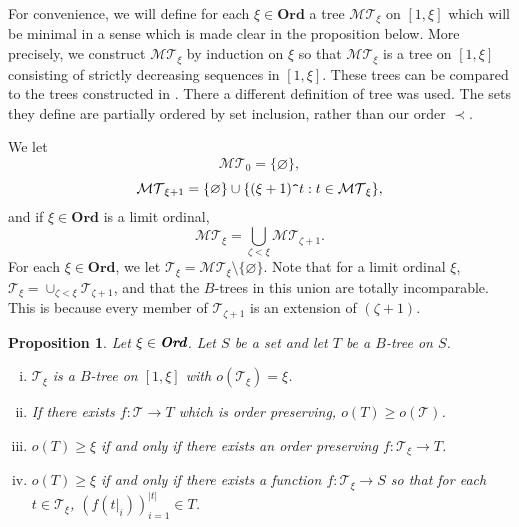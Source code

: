 \documentclass[12pt]{amsart}
\newtheorem{proposition}[theorem]{Proposition}
\theoremstyle{definition}
\newcommand{\ord}{\textbf{Ord}}
\newcommand{\mt}{\mathcal{MT}}
\newcommand{\ttt}{\mathcal{T}}
\begin{document}
For convenience, we will define for each $\xi\in \ord$ a tree $\mt_\xi$ on $[1, \xi]$ which will be minimal in a sense which is made clear in the proposition below.  More precisely, we construct $\mt_\xi$ by induction on $\xi$ so that $\mt_\xi$ is a tree on $[1, \xi]$ consisting of strictly decreasing sequences in $[1, \xi]$.  These trees can be compared to the trees constructed in \cite{JO}.  There a different definition of tree was used.  The sets they define are partially ordered by set inclusion, rather than our order $\prec$.  

We let $$\mt_0=\{\varnothing\},$$ $$\mt_{\xi+1}=\{\varnothing\}\cup \{(\xi+1)\verb!^!t: t\in \mt_\xi\},$$ and if $\xi\in \ord$ is a limit ordinal, $$\mt_\xi=\bigcup_{\zeta<\xi}\mt_{\zeta+1}.$$  For each $\xi\in \ord$, we let $\ttt_\xi=\mt_\xi\setminus \{\varnothing\}$.  Note that for a limit ordinal $\xi$, $\ttt_\xi=\cup_{\zeta<\xi}\ttt_{\zeta+1}$, and that the $B$-trees in this union are totally incomparable.  This is because every member of $\ttt_{\zeta+1}$ is an extension of $(\zeta+1)$.  


\begin{proposition} Let $\xi\in \emph{\ord}$. Let $S$ be a set and let $T$ be a $B$-tree on $S$.    \begin{enumerate}[(i)]\item $\ttt_\xi$ is a $B$-tree on $[1, \xi]$ with $o(\ttt_\xi)=\xi$. \item If there exists $f:\ttt\to T$ which is order preserving, $o(T)\geqslant o(\ttt)$.  \item $o(T)\geqslant \xi$ if and only if there exists an order preserving $f:\ttt_\xi\to T$.  \item $o(T)\geqslant \xi$ if and only if there exists a function $f:\ttt_\xi\to S$ so that for each $t\in \ttt_\xi$, $(f(t|_i))_{i=1}^{|t|}\in T$.  
\end{enumerate}

\label{minimal trees}
\end{proposition}
\end{document}
